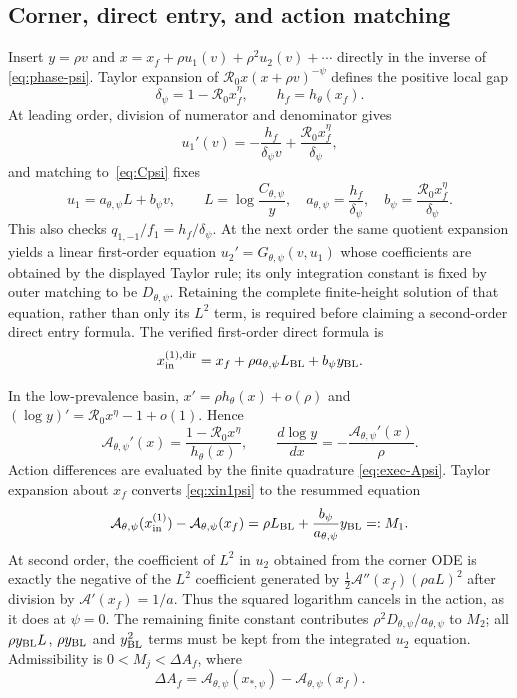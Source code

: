 \documentclass[11pt,a4paper]{article}
\newcommand{\Rzero}{\mathcal R_0}
\begin{document}
\subsection{Corner, direct entry, and action matching}
Insert $y=\rho v$ and
$x=x_f+\rho u_1(v)+\rho^2u_2(v)+\cdots$ directly in the inverse of
\eqref{eq:phase-psi}.  Taylor expansion of
$\Rzero x(x+\rho v)^{-\psi}$ defines the positive local gap
\[
 \delta_{\psi}=1-\Rzero x_f^\eta,\qquad h_f=h_\theta(x_f).
\]
At leading order, division of numerator and denominator gives
\[
 u_1'(v)=-\frac{h_f}{\delta_\psi v}
 +\frac{\Rzero x_f^\eta}{\delta_\psi},
\]
and matching to~\eqref{eq:Cpsi} fixes
\begin{equation}
 u_1=a_{\theta,\psi}L+b_\psi v,\qquad
 L=\log\frac{C_{\theta,\psi}}{y},\quad
 a_{\theta,\psi}=\frac{h_f}{\delta_\psi},\quad
 b_\psi=\frac{\Rzero x_f^\eta}{\delta_\psi}.
 \label{eq:u1psi}
\end{equation}
This also checks $q_{1,-1}/f_1=h_f/\delta_\psi$.  At the next order the
same quotient expansion yields a linear first-order equation
$u_2'=G_{\theta,\psi}(v,u_1)$ whose coefficients are obtained by the displayed
Taylor rule; its only integration constant is fixed by outer matching to be
$D_{\theta,\psi}$.  Retaining the complete finite-height solution of that
equation, rather than only its $L^2$ term, is required before claiming a
second-order direct entry formula.  The verified first-order direct formula is
\begin{equation}
 x_{\rm in}^{(1),\mathrm{dir}}=x_f+\rho a_{\theta,\psi}L_{\rm BL}
 +b_\psi y_{\rm BL}.
 \label{eq:xin1psi}
\end{equation}

In the low-prevalence basin,
$x'=\rho h_\theta(x)+o(\rho)$ and
$(\log y)'=\Rzero x^\eta-1+o(1)$.  Hence
\begin{equation}
 \mathcal A_{\theta,\psi}'(x)
 =\frac{1-\Rzero x^\eta}{h_\theta(x)},\qquad
 \frac{d\log y}{dx}=-\frac{\mathcal A_{\theta,\psi}'(x)}\rho.
 \label{eq:Apsi}
\end{equation}
Action differences are evaluated by the finite quadrature
\eqref{eq:exec-Apsi}.  Taylor expansion about $x_f$ converts
\eqref{eq:xin1psi} to the resummed equation
\begin{equation}
 \mathcal A_{\theta,\psi}(x_{\rm in}^{(1)})
 -\mathcal A_{\theta,\psi}(x_f)
 =\rho L_{\rm BL}+\frac{b_\psi}{a_{\theta,\psi}}y_{\rm BL}=:M_1.
 \label{eq:M1psi}
\end{equation}
At second order, the coefficient of $L^2$ in $u_2$ obtained from the corner
ODE is exactly the negative of the $L^2$ coefficient generated by
$\tfrac12\mathcal A''(x_f)(\rho aL)^2$ after division by
$\mathcal A'(x_f)=1/a$.  Thus the squared logarithm cancels in the action,
as it does at $\psi=0$.  The remaining finite constant contributes
$\rho^2D_{\theta,\psi}/a_{\theta,\psi}$ to $M_2$; all
$\rho y_{\rm BL}L$, $\rho y_{\rm BL}$ and $y_{\rm BL}^2$ terms must be kept
from the integrated $u_2$ equation.  Admissibility is
$0<M_j<\Delta A_f$, where
\[
 \Delta A_f=\mathcal A_{\theta,\psi}(x_{*,\psi})
 -\mathcal A_{\theta,\psi}(x_f).
\]
\end{document}
